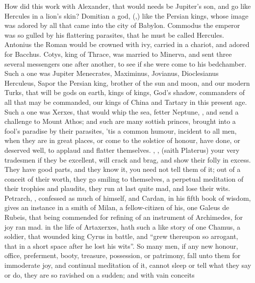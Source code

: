 How did this work with Alexander, that would needs be Jupiter's son, and go
like Hercules in a lion's skin? Domitian a god,
(,) like the
Persian kings, whose image was adored by all that came
into the city of Babylon. Commodus the emperor was so gulled by his flattering
parasites, that he must be called Hercules. Antonius the
Roman would be crowned with ivy, carried in a chariot, and adored for Bacchus.
Cotys, king of Thrace, was married to Minerva, and sent
three several messengers one after another, to see if she were come to his
bedchamber. Such a one was Jupiter Menecrates, Maximinus,
Jovianus, Dioclesianus Herculeus, Sapor the Persian king, brother of the sun
and moon, and our modern Turks, that will be gods on earth, kings of kings,
God's shadow, commanders of all that may be commanded, our kings of China and
Tartary in this present age. Such a one was Xerxes, that would whip the sea,
fetter Neptune, , and send a challenge to Mount Athos; and
such are many sottish princes, brought into a fool's paradise by their
parasites, 'tis a common humour, incident to all men, when they are in great
places, or come to the solstice of honour, have done, or deserved well, to
applaud and flatter themselves. , \etc{}, (saith
Platerus) your very tradesmen if they be excellent, will
crack and brag, and show their folly in excess. They have good parts, and they
know it, you need not tell them of it; out of a conceit of their worth, they go
smiling to themselves, a perpetual meditation of their trophies and plaudits,
they run at last quite mad, and lose their wits. Petrarch,
, confessed as much of himself,
and Cardan, in his fifth book of wisdom, gives an instance in a smith of Milan,
a fellow-citizen of his, one Galeus de Rubeis, that being
commended for refining of an instrument of Archimedes, for joy ran mad.
\Plutarch{} in the life of Artaxerxes, hath such a like story of one Chamus, a
soldier, that wounded king Cyrus in battle, and \enquote{grew thereupon so
arrogant, that in a short space after he lost his wits}.
So many men, if any new honour, office, preferment, booty, treasure,
possession, or patrimony,  fall unto them for immoderate joy,
and continual meditation of it, cannot sleep or tell what
they say or do, they are so ravished on a sudden; and with vain conceits
